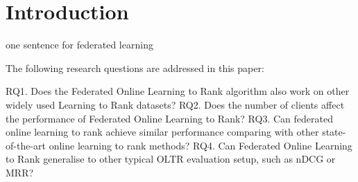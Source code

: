 \section{Introduction}

one sentence for federated learning

The following research questions are addressed in this paper:

RQ1. Does the Federated Online Learning to Rank algorithm also work on other widely used Learning to Rank datasets?
RQ2. Does the number of clients affect the performance of Federated Online Learning to Rank?
RQ3. Can federated online learning to rank achieve similar performance comparing with other state-of-the-art online learning to rank methods?
RQ4. Can Federated Online Learning to Rank generalise to other typical OLTR evaluation setup, such as nDCG or MRR?
